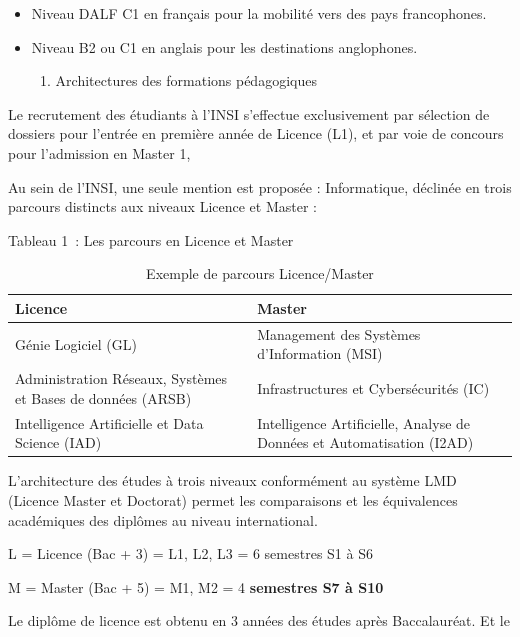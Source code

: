 \begin{itemize}
	\item
	Niveau DALF C1 en français pour la mobilité vers des pays
	francophones.
	\item
	Niveau B2 ou C1 en anglais pour les destinations anglophones.
	
	\begin{enumerate}
		\def\labelenumi{\arabic{enumi}.}
		\item
		Architectures des formations pédagogiques
	\end{enumerate}
\end{itemize}

Le recrutement des étudiants à l'INSI s'effectue exclusivement par
sélection de dossiers pour l'entrée en première année de Licence (L1),
et par voie de concours pour l'admission en Master 1,

Au sein de l'INSI, une seule mention est proposée : Informatique,
déclinée en trois parcours distincts aux niveaux Licence et Master :

Tableau 1~: Les parcours en Licence et Master

\begin{table}[H]
	\centering
	\begin{tabular}{|p{7cm}|p{7cm}|}
		\hline
		\textbf{Licence} & \textbf{Master} \\
		\hline
		Génie Logiciel (GL) & Management des Systèmes d’Information (MSI) \\
		\hline
		Administration Réseaux, Systèmes et Bases de données (ARSB) & Infrastructures et Cybersécurités (IC) \\
		\hline
		Intelligence Artificielle et Data Science (IAD) & Intelligence Artificielle, Analyse de Données et Automatisation (I2AD) \\
		\hline
	\end{tabular}
	\caption{Exemple de parcours Licence/Master}
\end{table}


L'architecture des études à trois niveaux conformément au système LMD
(Licence Master et Doctorat) permet les comparaisons et les équivalences
académiques des diplômes au niveau international.

L = Licence (Bac + 3) = L1, L2, L3 = 6 semestres S1 à S6

M = Master (Bac + 5) = M1, M2 = 4 \textbf{semestres S7 à S10}

Le diplôme de licence est obtenu en 3 années des études après
Baccalauréat. Et le

